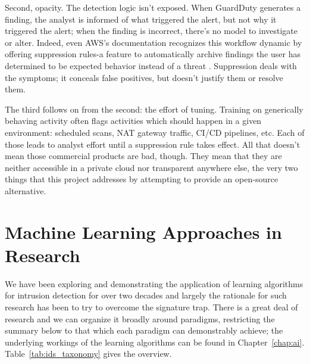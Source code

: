 Second, opacity. The detection logic isn’t exposed. When GuardDuty generates a finding, the analyst is informed of what triggered the alert, but not why it triggered the alert; when the finding is incorrect, there’s no model to investigate or alter. 
Indeed, even AWS’s documentation recognizes this workflow dynamic by offering suppression rules-a feature to automatically archive findings the user has determined to be expected behavior instead of a threat \cite{aws_guardduty_suppression}. 
Suppression deals with the symptoms; it conceals false positives, but doesn’t justify them or resolve them.

The third follows on from the second: the effort of tuning. Training on generically behaving activity often flags activities which should happen in a given environment: scheduled scans, NAT gateway traffic, CI/CD pipelines, etc. Each of those leads to analyst effort until a suppression rule takes effect. 
All that doesn’t mean those commercial products are bad, though. They mean that they are neither accessible in a private cloud nor transparent anywhere else, the very two things that this project addresses by attempting to provide an open-source alternative.


\section{Machine Learning Approaches in Research}
\label{sec:ids_ml}

We have been exploring and demonstrating the application of learning algorithms for intrusion detection for over two decades and largely the rationale for such research has been to try to overcome the signature trap. There is a great deal of research and we can organize it broadly around paradigms, restricting the summary below to that which each paradigm can demonstrably achieve; the underlying workings of the learning algorithms can be found in Chapter~\ref{chap:ai}. Table~\ref{tab:ids_taxonomy} gives the overview.

